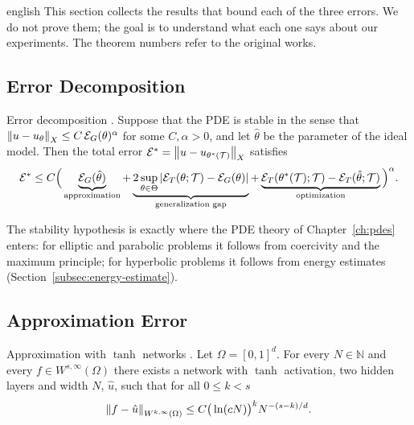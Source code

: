 \documentclass[0000.tex]{subfiles}
\begin{document}
\begin{hyphenrules}{english}
This section collects the results that bound each of the three errors. We do not prove them; the goal
is to understand what each one says about our experiments. The theorem numbers refer to the original
works.

\subsection{Error Decomposition}

\begin{teorema}{Error decomposition \cite[Lemma~3.1 and Eq.~3.11]{deryck2022generic,deryck2024acta}.}\label{thm:error-decomp}
Suppose that the PDE is stable in the sense that $\left\lVert u-u_\theta \right\rVert_X\le C\,\mathcal{E}_G(\theta)^{\alpha}$
for some $C,\alpha>0$, and let $\hat\theta$ be the parameter of the ideal model. Then the total error
$\mathcal{E}^{*}=\left\lVert u-u_{\theta^{*}(\mathcal{T})} \right\rVert_X$ satisfies
\[
  \mathcal{E}^{*}\le C\Big(\underbrace{\mathcal{E}_G(\hat\theta)}_{\text{approximation}}
  +\underbrace{2\sup_{\theta\in\Theta}\left\lvert \mathcal{E}_T(\theta;\mathcal{T})-\mathcal{E}_G(\theta) \right\rvert}_{\text{generalization gap}}
  +\underbrace{\mathcal{E}_T(\theta^{*}(\mathcal{T});\mathcal{T})-\mathcal{E}_T(\hat\theta;\mathcal{T})}_{\text{optimization}}\Big)^{\alpha}.
\]
\end{teorema}

The stability hypothesis is exactly where the PDE theory of Chapter~\ref{ch:pdes} enters: for elliptic and
parabolic problems it follows from coercivity and the maximum principle; for hyperbolic problems it
follows from energy estimates (Section~\ref{subsec:energy-estimate}).

\subsection{Approximation Error}

\begin{teorema}{Approximation with $\tanh$ networks \cite[Theorem~4.4]{deryck2021tanh}.}\label{thm:tanh-approx}
Let $\Omega=[0,1]^d$. For every $N\in\mathbb{N}$ and every $f\in W^{s,\infty}(\Omega)$ there exists a network
with $\tanh$ activation, two hidden layers and width $N$, $\hat u$, such that for all $0\le k<s$
\[
  \left\lVert f-\hat u \right\rVert_{W^{k,\infty}(\Omega)}\le C\big(\ln(cN)\big)^{k}N^{-(s-k)/d}.
\]
\end{teorema}


\end{hyphenrules}
\end{document}
